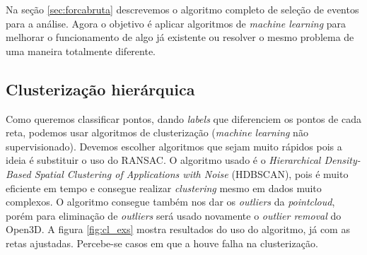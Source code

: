 \documentclass[a4paper,12pt,oneside]{book}
\begin{document}
\par Na seção \ref{sec:forcabruta} descrevemos o algoritmo completo de seleção de eventos para a análise. Agora o objetivo é aplicar algoritmos de \textit{machine learning} para melhorar o funcionamento de algo já existente ou resolver o mesmo problema de uma maneira totalmente diferente.

\subsection{Clusterização hierárquica}

\par Como queremos classificar pontos, dando \textit{labels} que diferenciem os pontos de cada reta, podemos usar algoritmos de clusterização (\textit{machine learning} não supervisionado). Devemos escolher algoritmos que sejam muito rápidos pois a ideia é substituir o uso do RANSAC. O algoritmo usado é o \textit{Hierarchical Density-Based Spatial Clustering of Applications with Noise} (HDBSCAN)\cite{hdbscan1, hdbscan2}, pois é muito eficiente em tempo e consegue realizar \textit{clustering} mesmo em dados muito complexos. O algoritmo consegue também nos dar os \textit{outliers} da \textit{pointcloud}, porém para eliminação de \textit{outliers} será usado novamente o \textit{outlier removal} do Open3D. A figura \ref{fig:cl_exs} mostra resultados do uso do algoritmo, já com as retas ajustadas. Percebe-se casos em que a houve falha na clusterização.
\end{document}
